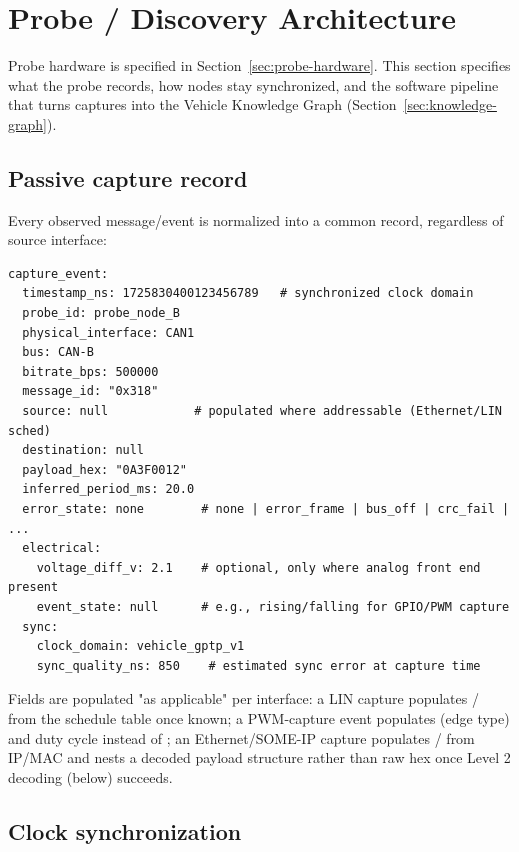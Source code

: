 \section{Probe / Discovery Architecture}
\label{sec:probe-discovery}

Probe hardware is specified in Section~\ref{sec:probe-hardware}. This section specifies what the probe records, how nodes stay synchronized, and the software pipeline that turns captures into the Vehicle Knowledge Graph (Section~\ref{sec:knowledge-graph}).

\subsection{Passive capture record}

Every observed message/event is normalized into a common record, regardless of source interface:

\begin{lstlisting}[language=alfredspec]
capture_event:
  timestamp_ns: 1725830400123456789   # synchronized clock domain
  probe_id: probe_node_B
  physical_interface: CAN1
  bus: CAN-B
  bitrate_bps: 500000
  message_id: "0x318"
  source: null            # populated where addressable (Ethernet/LIN sched)
  destination: null
  payload_hex: "0A3F0012"
  inferred_period_ms: 20.0
  error_state: none        # none | error_frame | bus_off | crc_fail | ...
  electrical:
    voltage_diff_v: 2.1    # optional, only where analog front end present
    event_state: null      # e.g., rising/falling for GPIO/PWM capture
  sync:
    clock_domain: vehicle_gptp_v1
    sync_quality_ns: 850    # estimated sync error at capture time
\end{lstlisting}

Fields are populated "as applicable" per interface: a LIN capture populates / from the schedule table once known; a PWM-capture event populates  (edge type) and duty cycle instead of ; an Ethernet/SOME-IP capture populates / from IP/MAC and nests a decoded payload structure rather than raw hex once Level 2 decoding (below) succeeds.

\subsection{Clock synchronization}

